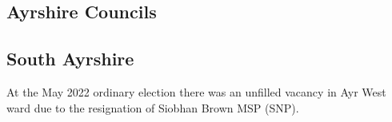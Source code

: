 \documentclass[a4paper,openany]{book}
\begin{document}
\begin{resultsiii}
%
%
%
%
%
%
%

\section{Ayrshire Councils}

\subsection*{South Ayrshire}

At the May 2022 ordinary election there was an unfilled vacancy in Ayr West ward due to the resignation of Siobhan Brown MSP (SNP).%


\end{resultsiii}
\end{document}
